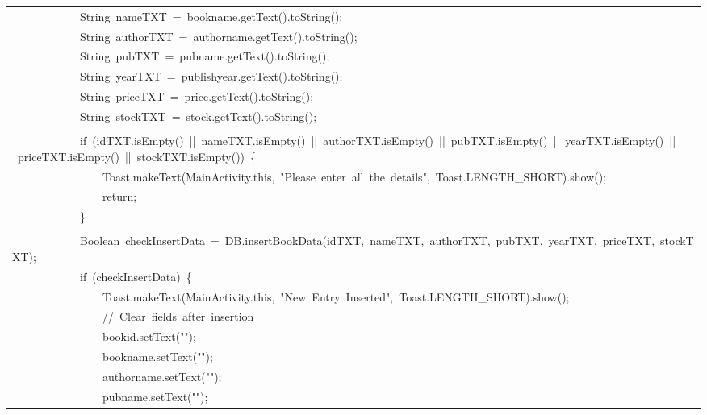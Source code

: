 \documentclass[a4paper,12pt]{article}
\begin{document}
\begin{longtable}{|p{}|}
{\ttfamily\small \ \ \ \ \ \ \ \ \ \ \ \ String\ nameTXT\ =\ bookname.getText().toString();} \\
{\ttfamily\small \ \ \ \ \ \ \ \ \ \ \ \ String\ authorTXT\ =\ authorname.getText().toString();} \\
{\ttfamily\small \ \ \ \ \ \ \ \ \ \ \ \ String\ pubTXT\ =\ pubname.getText().toString();} \\
{\ttfamily\small \ \ \ \ \ \ \ \ \ \ \ \ String\ yearTXT\ =\ publishyear.getText().toString();} \\
{\ttfamily\small \ \ \ \ \ \ \ \ \ \ \ \ String\ priceTXT\ =\ price.getText().toString();} \\
{\ttfamily\small \ \ \ \ \ \ \ \ \ \ \ \ String\ stockTXT\ =\ stock.getText().toString();} \\
\strut \\
{\ttfamily\small \ \ \ \ \ \ \ \ \ \ \ \ if\ (idTXT.isEmpty()\ ||\ nameTXT.isEmpty()\ ||\ authorTXT.isEmpty()\ ||\ pubTXT.isEmpty()\ ||\ yearTXT.isEmpty()\ ||\ priceTXT.isEmpty()\ ||\ stockTXT.isEmpty())\ \{} \\
{\ttfamily\small \ \ \ \ \ \ \ \ \ \ \ \ \ \ \ \ Toast.makeText(MainActivity.this,\ "Please\ enter\ all\ the\ details",\ Toast.LENGTH\_SHORT).show();} \\
{\ttfamily\small \ \ \ \ \ \ \ \ \ \ \ \ \ \ \ \ return;} \\
{\ttfamily\small \ \ \ \ \ \ \ \ \ \ \ \ \}} \\
\strut \\
{\ttfamily\small \ \ \ \ \ \ \ \ \ \ \ \ Boolean\ checkInsertData\ =\ DB.insertBookData(idTXT,\ nameTXT,\ authorTXT,\ pubTXT,\ yearTXT,\ priceTXT,\ stockTXT);} \\
{\ttfamily\small \ \ \ \ \ \ \ \ \ \ \ \ if\ (checkInsertData)\ \{} \\
{\ttfamily\small \ \ \ \ \ \ \ \ \ \ \ \ \ \ \ \ Toast.makeText(MainActivity.this,\ "New\ Entry\ Inserted",\ Toast.LENGTH\_SHORT).show();} \\
{\ttfamily\small \ \ \ \ \ \ \ \ \ \ \ \ \ \ \ \ //\ Clear\ fields\ after\ insertion} \\
{\ttfamily\small \ \ \ \ \ \ \ \ \ \ \ \ \ \ \ \ bookid.setText("");} \\
{\ttfamily\small \ \ \ \ \ \ \ \ \ \ \ \ \ \ \ \ bookname.setText("");} \\
{\ttfamily\small \ \ \ \ \ \ \ \ \ \ \ \ \ \ \ \ authorname.setText("");} \\
{\ttfamily\small \ \ \ \ \ \ \ \ \ \ \ \ \ \ \ \ pubname.setText("");} \\

\end{longtable}
\end{document}
